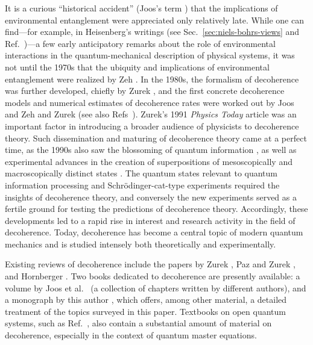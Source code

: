 \documentclass[3p,sort&compress]{elsarticle}
\begin{document}
It is a curious ``historical accident'' (Joos's term \cite[p.~13]{Joos:1999:po}) that the implications of environmental entanglement were appreciated only relatively late. While one can find---for example, in Heisenberg's writings (see Sec.~\ref{sec:niels-bohrs-views} and Ref.~\cite{Camilleri:2015:oo})---a few early anticipatory remarks about the role of environmental interactions in the quantum-mechanical description of physical systems, it was not until the 1970s that the ubiquity and implications of environmental entanglement were realized by Zeh \cite{Zeh:1970:yt,Kubler:1973:ux}. In the 1980s, the formalism of decoherence was further developed, chiefly by Zurek \cite{Zurek:1981:dd,Zurek:1982:tv}, and the first concrete decoherence models and numerical estimates of decoherence rates were worked out by Joos and Zeh \cite{Joos:1985:iu} and Zurek \cite{Zurek:1986:uz} (see also Refs~\cite{Walls:1985:pp,Walls:1985:lm,Caldeira:1985:tt}). Zurek's 1991 \emph{Physics Today} article \cite{Zurek:1991:vv} was an important factor in introducing a broader audience of physicists to decoherence theory. Such dissemination and maturing of decoherence theory came at a perfect time, as the 1990s also saw the blossoming of quantum information \cite{Feynman:1982:yy,Deutsch:1985:ym,Deutsch:1992:tv,Berthiaume:1992:lk,Berthiaume:1992:lm,Bernstein:1993:yy,Simon:1994:lk,Shor:1994:om,Shor:1997:tt,Grover:1996:rr,Grover:1997:mm}, as well as experimental advances in the creation of superpositions of mesoscopically and macroscopically distinct states \cite{Brune:1996:om,Arndt:1999:rc,Friedman:2000:rr,Wal:2000:om}. The quantum states relevant to quantum information processing and Schr\"odinger-cat-type experiments required the insights of decoherence theory, and conversely the new experiments served as a fertile ground for testing the predictions of decoherence theory. Accordingly, these developments led to a rapid rise in interest and research activity in the field of decoherence. Today, decoherence has become a central topic of modern quantum mechanics and is studied intensely both theoretically and experimentally.

Existing reviews of decoherence include the papers by Zurek \cite{Zurek:2002:ii}, Paz and Zurek \cite{Paz:2001:aa}, and Hornberger \cite{Hornberger:2009:aq}. Two books dedicated to decoherence are presently available: a volume by Joos et al.\ \cite{Joos:2003:jh} (a collection of chapters written by different authors), and a monograph by this author \cite{Schlosshauer:2007:un}, which offers, among other material, a detailed treatment of the topics surveyed in this paper. Textbooks on open quantum systems, such as Ref.~\cite{Breuer:2002:oq}, also contain a substantial amount of material on decoherence, especially in the context of quantum master equations. 
\end{document}
